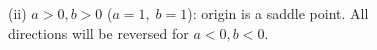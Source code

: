 \documentclass[12pt]{article}
\begin{document}
\begin{ex}
\begin{solution}
\begin{enumerate}[(i)]
  \begin{figure}[h]
  \centering
  \begin{minipage}[t]{0.45\textwidth}
    \centering
    \caption{(ii) $a>0,b>0$ ($a=1,\;b=1$): origin is a saddle point. All directions will be reversed for $a<0,b<0$.}
    \label{Figure_ii_saddle}
  \end{minipage}\hfill
  \begin{minipage}[t]{0.45\textwidth}
    \centering

\end{minipage}
\end{figure}
\end{enumerate}
\end{solution}
\end{ex}
\end{document}
